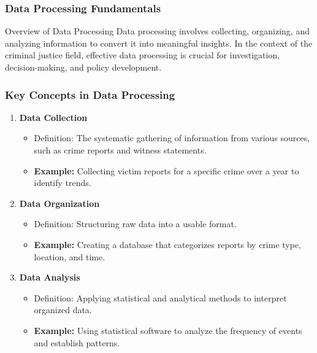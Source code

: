 \documentclass[aspectratio=169]{beamer}
\begin{document}
\begin{frame}[fragile]
    \frametitle{Data Processing Fundamentals}
    \begin{block}{Overview of Data Processing}
        Data processing involves collecting, organizing, and analyzing information to convert it into meaningful insights. In the context of the criminal justice field, effective data processing is crucial for investigation, decision-making, and policy development.
    \end{block}
\end{frame}

\begin{frame}[fragile]
    \frametitle{Key Concepts in Data Processing}
    \begin{enumerate}
        \item \textbf{Data Collection} 
            \begin{itemize}
                \item Definition: The systematic gathering of information from various sources, such as crime reports and witness statements.
                \item \textbf{Example:} Collecting victim reports for a specific crime over a year to identify trends.
            \end{itemize}
        
        \item \textbf{Data Organization} 
            \begin{itemize}
                \item Definition: Structuring raw data into a usable format.
                \item \textbf{Example:} Creating a database that categorizes reports by crime type, location, and time.
            \end{itemize}

        \item \textbf{Data Analysis} 
            \begin{itemize}
                \item Definition: Applying statistical and analytical methods to interpret organized data.
                \item \textbf{Example:} Using statistical software to analyze the frequency of events and establish patterns.
            \end{itemize}
    \end{enumerate}
\end{frame}
\end{document}

